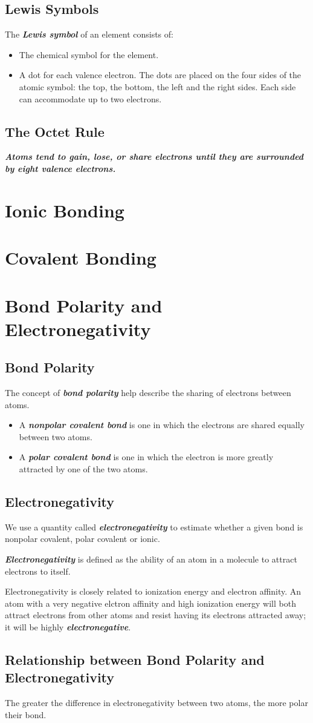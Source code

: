 \documentclass[12pt, a4paper]{report}
\newcommand{\impt}[1]{\textbf{\textit{#1}}}
\newcommand{\hi}{\section}
\newcommand{\hii}{\subsection}
\begin{document}
    \hii{Lewis Symbols}
        \par The \impt{Lewis symbol} of an element consists of:
        \begin{itemize}
            \item The chemical symbol for the element.
            \item A dot for each valence electron. The dots are placed on the four sides of the
                atomic symbol: the top, the bottom, the left and the right sides. Each side
                can accommodate up to two electrons.
        \end{itemize}

    \hii{The Octet Rule}
        \par \impt{Atoms tend to gain, lose, or share electrons until they are surrounded by
        eight valence electrons.}

\hi{Ionic Bonding}
    
\hi{Covalent Bonding}

\hi{Bond Polarity and Electronegativity}
    \hii{Bond Polarity}
        \par The concept of \impt{bond polarity} help describe the sharing of electrons between
        atoms.
        \begin{itemize}
            \item A \impt{nonpolar covalent bond} is one in which the electrons are shared equally
                between two atoms.
            \item A \impt{polar covalent bond} is one in which the electron is more greatly
                attracted by one of the two atoms.
        \end{itemize}

    \hii{Electronegativity}
        \par We use a quantity called \impt{electronegativity} to estimate whether a given bond
        is nonpolar covalent, polar covalent or ionic.
        \par \impt{Electronegativity} is defined as the ability of an atom in a molecule to attract
        electrons to itself.
        \par Electronegativity is closely related to ionization energy and electron affinity. An
        atom with a very negative elctron affinity and high ionization energy will both attract
        electrons from other atoms and resist having its electrons attracted away; it will be
        highly \impt{electronegative}.

    \hii{Relationship between Bond Polarity and Electronegativity}
        \par The greater the difference in electronegativity between two atoms, the more polar
        their bond.
\end{document}
